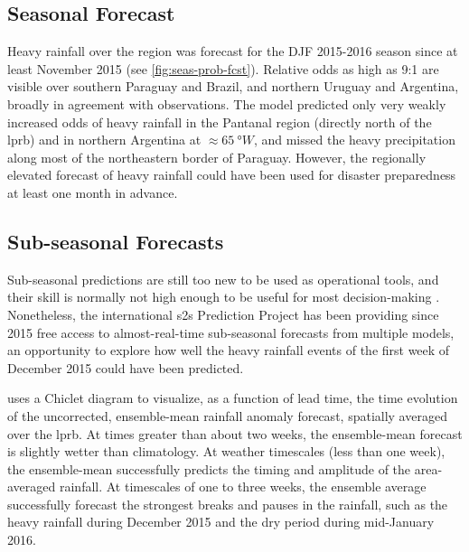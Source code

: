 \documentclass[twocol]{ametsoc}
\begin{document}
\subsection{Seasonal Forecast}

Heavy rainfall over the region was forecast for the DJF 2015-2016 season since at least November 2015 (see \cref{fig:seas-prob-fcst}).
Relative odds as high as 9:1 are visible over southern Paraguay and Brazil, and northern Uruguay and Argentina, broadly in agreement with observations.
The model predicted only very weakly increased odds of heavy rainfall in the Pantanal region (directly north of the \gls{lprb}) and in northern Argentina at $\approx \SI{65}{\degree W}$, and missed the heavy precipitation along most of the northeastern border of Paraguay.
However, the regionally elevated forecast of heavy rainfall could have been used for disaster preparedness at least one month in advance.

\subsection{Sub-seasonal Forecasts}

Sub-seasonal predictions are still too new to be used as operational tools, and their skill is normally not high enough to be useful for most decision-making \citep{Vigaud2017}.
Nonetheless, the international \gls{s2s} Prediction Project \citep{Vitart2016} has been providing since 2015 free access to almost-real-time sub-seasonal forecasts from multiple models, an opportunity to explore how well the heavy rainfall events of the first week of December 2015 could have been predicted.

 uses a Chiclet diagram \citep{Carbin2016} to visualize, as a function of lead time, the time evolution of the uncorrected, ensemble-mean rainfall anomaly forecast, spatially averaged over the \gls{lprb}.
At times greater than about two weeks, the ensemble-mean forecast is slightly wetter than climatology.
At weather timescales (less than one week), the ensemble-mean successfully predicts the timing and amplitude of the area-averaged rainfall.
At timescales of one to three weeks, the ensemble average successfully forecast the strongest breaks and pauses in the rainfall, such as the heavy rainfall during December 2015 and the dry period during mid-January 2016.
\end{document}
